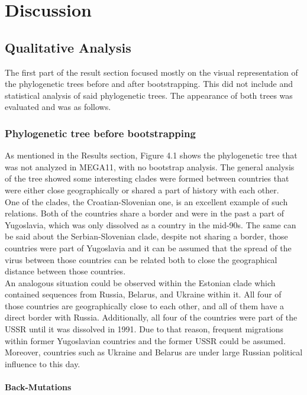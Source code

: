 \chapter{Discussion}
\section{Qualitative Analysis}

The first part of the result section focused mostly on the visual representation of the phylogenetic trees before and after bootstrapping. 
This did not include and statistical analysis of said phylogenetic trees. 
The appearance of both trees was evaluated and was as follows.  

\subsection{Phylogenetic  tree before bootstrapping}

As mentioned in the Results section, Figure 4.1 shows the phylogenetic tree that was not analyzed in MEGA11, with no bootstrap analysis. 
The general analysis of the tree showed some interesting clades were formed between countries that were either close geographically or shared a part of history with each other. \\
One of the clades, the Croatian-Slovenian one, is an excellent example of such relations. 
Both of the countries share a border and were in the past a part of Yugoslavia, which was only dissolved as a country in the mid-90s. 
The same can be said about the Serbian-Slovenian clade, despite not sharing a border, those countries were part of Yugoslavia and it can be assumed that the spread of the virus between those countries can be related both to close the geographical distance between those countries.\\
An analogous situation could be observed within the Estonian clade which contained sequences from Russia, Belarus, and Ukraine within it. 
All four of those countries are geographically close to each other, and all of them have a direct border with Russia. 
Additionally, all four of the countries were part of the USSR until it was dissolved in 1991. 
Due to that reason, frequent migrations within former Yugoslavian countries and the former USSR could be assumed. 
Moreover, countries such as Ukraine and Belarus are under large Russian political influence to this day. 


\subsubsection{Back-Mutations}

